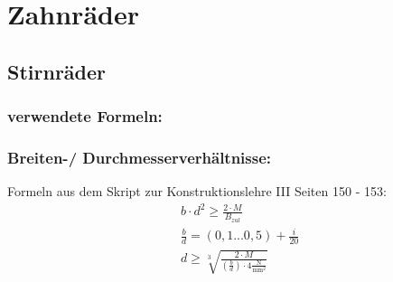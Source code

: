 \section{Zahnräder}
\subsection{Stirnräder}
\subsubsection{verwendete Formeln:}



\subsubsection{Breiten-/ Durchmesserverhältnisse:}
Formeln aus dem Skript zur Konstruktionslehre III Seiten 150 - 153:
\begin{align*}
&b \cdot d^2 \ge\frac{2 \cdot M}{B_{zul}} \\
&\frac{b}{d} = (0,1...0,5) + \frac{i}{20} \\
&d \ge \sqrt[3]{\frac{2 \cdot M}{( \frac{b}{d}) \cdot  4 \frac{\text{N}}{\text{mm}^2}}}
\end{align*}
